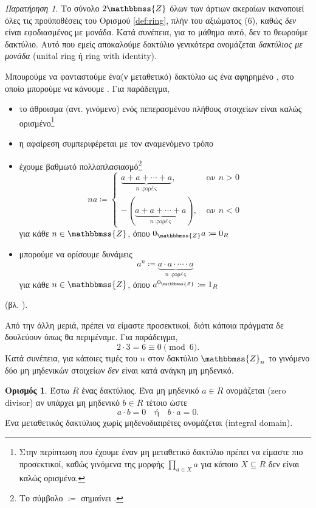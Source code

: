 \documentclass[12pt,a4paper,reqno]{amsart}
\theoremstyle{definition}
\newtheorem{definition}[theorem]{Ορισμός}
\theoremstyle{remark}
\newtheorem*{remark}{Παρατήρηση}
\numberwithin{theorem}{section}
\numberwithin{exercise}{section}
\numberwithin{equation}{section}
\newcommand{\ZZ}{\mathbbmss{Z}}
\newcommand{\defn}[1]{{\color{mylightblue}{#1}}}
\begin{document}
\begin{remark}
    Το σύνολο $2\ZZ$ όλων των άρτιων ακεραίων ικανοποιεί όλες τις προϋποθέσεις του Ορισμού \ref{def:ring}, πλήν του αξιώματος (6), καθώς \emph{δεν} είναι εφοδιασμένος με μονάδα. Κατά συνέπεια, για το μάθημα αυτό, δεν το θεωρούμε δακτύλιο. Αυτό που εμείς αποκαλούμε δακτύλιο γενικότερα ονομάζεται \emph{δακτύλιος με μονάδα} (unital ring ή ring with identity).
\end{remark}

Μπουρούμε να φανταστούμε ένα(ν μεταθετικό) δακτύλιο ως ένα αφηρημένο , στο οποίο μπορούμε να κάνουμε . Για παράδειγμα,
\begin{itemize}
    \item το άθροισμα (αντ. γινόμενο) ενός πεπερασμένου πλήθους στοιχείων είναι καλώς ορισμένο\footnote{Στην περίπτωση που έχουμε έναν μη μεταθετικό δακτύλιο πρέπει να είμαστε πιο προσεκτικοί, καθώς γινόμενα της μορφής $\prod_{a \in X}a$ για κάποιο $X\subseteq R$ δεν είναι καλώς ορισμένα.}
    \item η αφαίρεση συμπεριφέρεται με τον αναμενόμενο τρόπο
    \item έχουμε βαθμωτό πολλαπλασιασμό\footnote{Το σύμβολο $\coloneqq$ σημαίνει .}
    \[
    n a \coloneq
    \begin{cases}
        \underbrace{a + a + \cdots + a}_{\text{$n$ φορές}}, &\ \text{αν $n > 0$} \\
        -(\underbrace{a + a + \cdots + a}_{\text{$n$ φορές}}), &\ \text{αν $n < 0$}
    \end{cases}
    \]
    για κάθε $n \in \ZZ$, όπου $0_\ZZ a \coloneqq 0_R$
    \item μπορούμε να ορίσουμε δυνάμεις 
    \[
    a^n \coloneq \underbrace{a\cdot a \cdot \cdots \cdot a}_{\text{$n$ φορές}}
    \]
    για κάθε $n \in \ZZ$, όπου $a^{0_\ZZ} \coloneqq 1_R$
\end{itemize}
(βλ. \cite[Πρόταση~7.1.4]{Mpe15}).

Από την άλλη μεριά, πρέπει να είμαστε προσεκτικοί, διότι κάποια πράγματα δε δουλεύουν όπως θα περιμέναμε. Για παράδειγμα, 
\[
2 \cdot 3 = 6 \equiv 0 \pmod{6}.
\]
Κατά συνέπεια, για κάποιες τιμές του $n$ στον δακτύλιο $\ZZ_n$ το γινόμενο δύο μη μηδενικών στοιχείων \emph{δεν} είναι κατά ανάγκη μη μηδενικό.

\begin{definition}
    \label{def:zero_divisor_integral_domain}
    Έστω $R$ ένας δακτύλιος. Ένα μη μηδενικό $a \in R$ ονομάζεται \defn{μηδενοδιαιρέτης} (zero divisor) αν υπάρχει μη μηδενικό $b \in R$ τέτοιο ώστε 
    \[
    a \cdot b = 0 \quad \text{ή} \quad b \cdot a = 0.
    \]
    Ένα μεταθετικός δακτύλιος χωρίς μηδενοδιαιρέτες ονομάζεται \defn{ακέραια περιοχή} (integral domain).
\end{definition}
\end{document}
